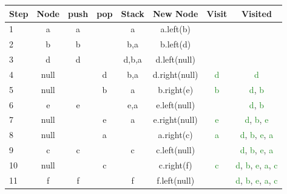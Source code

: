 \begin{center}
\begin{tabular}{ l|c|c|c|c|c|c|c } 
 Step & Node & push & pop & Stack & New Node & Visit & Visited \\
 \hline
 1  & a & a & & a & a.left(\textcolor{BrickRed}{b}) & & \\
 
 2  & b & b & & b,a & b.left(\textcolor{BrickRed}{d}) & & \\
 
 3  & d & d & & d,b,a & d.left(\textcolor{BrickRed}{null}) & & \\
 
 4  & null & & d & b,a & d.right(\textcolor{BrickRed}{null}) & \textcolor{ForestGreen}{d} & \textcolor{ForestGreen}{d} \\
 
 5  & null & & b & a & b.right(\textcolor{BrickRed}{e}) & \textcolor{ForestGreen}{b} & \textcolor{ForestGreen}{d}, \textcolor{ForestGreen}{b} \\
 
 6  & e & e &  & e,a & e.left(\textcolor{BrickRed}{null}) & & \textcolor{ForestGreen}{d}, \textcolor{ForestGreen}{b} \\
 
 7  & null & & e & a & e.right(\textcolor{BrickRed}{null}) & \textcolor{ForestGreen}{e} & \textcolor{ForestGreen}{d}, \textcolor{ForestGreen}{b}, \textcolor{ForestGreen}{e} \\
 
 8  & null & & a & & a.right(\textcolor{BrickRed}{c}) & \textcolor{ForestGreen}{a} & \textcolor{ForestGreen}{d}, \textcolor{ForestGreen}{b}, \textcolor{ForestGreen}{e}, \textcolor{ForestGreen}{a} \\
 
 9  & c & c &  & c & c.left(\textcolor{BrickRed}{null}) & & \textcolor{ForestGreen}{d}, \textcolor{ForestGreen}{b}, \textcolor{ForestGreen}{e}, \textcolor{ForestGreen}{a} \\
 
 10 & null & & c &  & c.right(\textcolor{BrickRed}{f}) & \textcolor{ForestGreen}{c} & \textcolor{ForestGreen}{d}, \textcolor{ForestGreen}{b}, \textcolor{ForestGreen}{e}, \textcolor{ForestGreen}{a}, \textcolor{ForestGreen}{c} \\
 
 11 & f & f &  & f & f.left(\textcolor{BrickRed}{null}) & & \textcolor{ForestGreen}{d}, \textcolor{ForestGreen}{b}, \textcolor{ForestGreen}{e}, \textcolor{ForestGreen}{a}, \textcolor{ForestGreen}{c} \\
 

\end{tabular}
\end{center}
